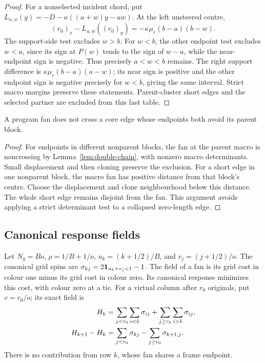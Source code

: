 \begin{proof}
For a nonselected incident chord, put $L_{a,w}(y)=-D-\kappa((a+w)y-aw)$. At the left unsteered centre,
\[
(r_0)_x-L_{a,w}((r_0)_y)=-\kappa\mu_r(b-a)(b-w).
\]
The support-side test excludes $w>b$. For $w<b$, the other endpoint test excludes $w<a$, since its sign at $P(w)$ tends to the sign of $w-a$, while the near-endpoint sign is negative. Thus precisely $a<w<b$ remains. The right support difference is $\kappa\mu_r(b-a)(a-w)$; its near sign is positive and the other endpoint sign is negative precisely for $w<b$, giving the same interval. Strict macro margins preserve these statements. Parent-cluster short edges and the selected partner are excluded from this last table.
\end{proof}

\begin{lemma}\label{lem:nonincident}
A program fan does not cross a core edge whose endpoints both avoid its parent block.
\end{lemma}
\begin{proof}
For endpoints in different nonparent blocks, the fan at the parent macro is noncrossing by Lemma~\ref{lem:double-chain}, with nonzero macro determinants. Small displacement and then cloning preserve the exclusion. For a short edge in one nonparent block, the macro fan has positive distance from that block's centre. Choose the displacement and clone neighbourhood below this distance. The whole short edge remains disjoint from the fan. This argument avoids applying a strict determinant test to a collapsed zero-length edge.
\end{proof}

\subsection{Canonical response fields}
Let $N_g=Bo$, $\rho=1/B+1/o$, $u_k=(k+1/2)/B$, and $v_j=(j+1/2)/o$. The canonical grid spins are
$\sigma_{kj}=2\mathbf 1_{u_k+v_j<1}-1$. The field of a fan is its grid cost in colour one minus its grid cost in colour zero. Its canonical response minimizes this cost, with colour zero at a tie. For a virtual column after $r_0$ originals, put $v=r_0/o$; its exact field is
\begin{align}
H_k&=\sum_{j<r_0}\sum_{i<k}\sigma_{ij}+\sum_{j\geq r_0}\sum_{i>k}\sigma_{ij},\notag\\
H_{k+1}-H_k&=\sum_{j<r_0}\sigma_{kj}-\sum_{j\geq r_0}\sigma_{k+1,j}.\label{eq:virtual-field}
\end{align}
There is no contribution from row $k$, whose fan shares a frame endpoint.

